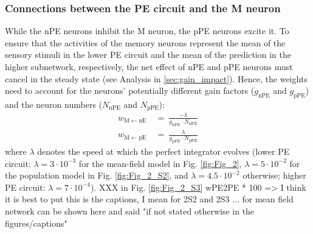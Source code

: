 \documentclass[10pt,a4paper,draft]{article}
\begin{document}
\subsubsection{Connections between the PE circuit and the M neuron}
%
While the nPE neurons inhibit the M neuron, the pPE neurons excite it. To ensure that the activities of the memory neurons represent the mean of the sensory stimuli in the lower PE circuit and the mean of the prediction in the higher subnetwork, respectively, the net effect of nPE and pPE neurons must cancel in the steady state (see Analysis in \ref{sec:gain_impact}). Hence, the weights need to account for the neurons' potentially different gain factors ($g_\mathrm{nPE}$ and $g_\mathrm{pPE}$) and the neuron numbers ($N_\mathrm{nPE}$ and $N_\mathrm{pPE}$):
%
\begin{align*}
w_\mathrm{M\leftarrow nE}\  &=\ \frac{-\lambda}{g_\mathrm{nPE} \cdot N_\mathrm{nPE}} \nonumber\\
w_\mathrm{M\leftarrow pE}\  &=\ \frac{\lambda}{g_\mathrm{pPE} \cdot N_\mathrm{pPE}}
\end{align*}
%
where $\lambda$ denotes the speed at which the perfect integrator evolves (lower PE circuit: $\lambda=3\cdot 10^{-3}$ for the mean-field model in Fig. \ref{fig:Fig_2},  $\lambda=5\cdot 10^{-2}$ for the population model in Fig. \ref{fig:Fig_2_S2}, and $\lambda=4.5\cdot 10^{-2}$ otherwise; higher PE circuit:  $\lambda = 7\cdot 10^{-4}$). XXX in Fig. \ref{fig:Fig_2_S3} wPE2PE * 100 => I think it is best to put this is the captions, I mean for 2S2 and 2S3 ... for mean field network can be shown here and said "if not stated otherwise in the figures/captions"
\end{document}
